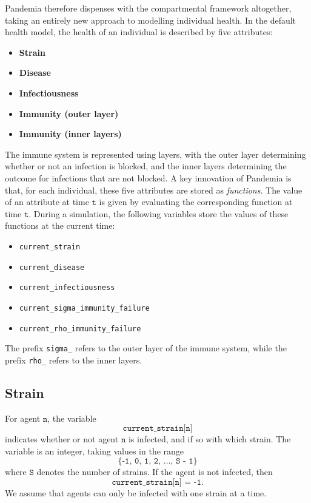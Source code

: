 \documentclass[10pt,letterpaper]{article}
\begin{document}
Pandemia therefore dispenses with the compartmental framework altogether, taking an entirely new approach to modelling individual health. In the default health model, the health of an individual is described by five attributes:
\begin{itemize}
\item \textbf{Strain}
\item \textbf{Disease}
\item \textbf{Infectiousness}
\item \textbf{Immunity (outer layer)}
\item \textbf{Immunity (inner layers)}
\end{itemize}
The immune system is represented using layers, with the outer layer determining whether or not an infection is blocked, and the inner layers determining the outcome for infections that are not blocked. A key innovation of Pandemia is that, for each individual, these five attributes are stored as \textit{functions}. The value of an attribute at time $\texttt{t}$ is given by evaluating the corresponding function at time $\texttt{t}$. During a simulation, the following variables store the values of these functions at the current time:
\begin{itemize}
\item \texttt{current{\_}strain}
\item \texttt{current{\_}disease}
\item \texttt{current{\_}infectiousness}
\item \texttt{current{\_}sigma{\_}immunity{\_}failure}
\item \texttt{current{\_}rho{\_}immunity{\_}failure}
\end{itemize}
The prefix \texttt{sigma{\_}} refers to the outer layer of the immune system, while the prefix \texttt{rho{\_}} refers to the inner layers.

\subsection{Strain}

For agent $\texttt{n}$, the variable $$\texttt{current{\_}strain[n]}$$ indicates whether or not agent $\texttt{n}$ is infected, and if so with which strain. The variable is an integer, taking values in the range $$\{\texttt{-1, 0, 1, 2, \ldots, S - 1}\}$$ where $\texttt{S}$ denotes the number of strains. If the agent is not infected, then $$\texttt{current{\_}strain[n] = -1}.$$ We assume that agents can only be infected with one strain at a time.
\end{document}
